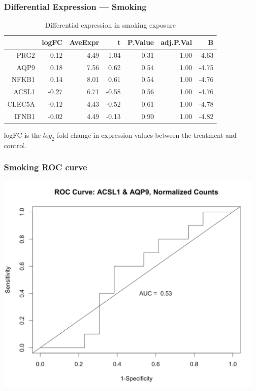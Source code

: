 \documentclass{beamer}
\begin{document}
\begin{frame}[fragile]
  	\frametitle{Differential Expression --- Smoking}
 		\begin{table}[ht]
		\caption {Differential expression in smoking exposure} \label{tab:smoking} 
		\centering
		\begin{tabular}{rrrrrrr}
 		 	\hline
 			& logFC & AveExpr & t & P.Value & adj.P.Val & B \\ 
 			 \hline
			PRG2 & 0.12 & 4.49 & 1.04 & 0.31 & 1.00 & -4.63 \\ 
  			AQP9 & 0.18 & 7.56 & 0.62 & 0.54 & 1.00 & -4.75 \\ 
  			NFKB1 & 0.14 & 8.01 & 0.61 & 0.54 & 1.00 & -4.76 \\ 
  			ACSL1 & -0.27 & 6.71 & -0.58 & 0.56 & 1.00 & -4.76 \\ 
  			CLEC5A & -0.12 & 4.43 & -0.52 & 0.61 & 1.00 & -4.78 \\ 
  			IFNB1 & -0.02 & 4.49 & -0.13 & 0.90 & 1.00 & -4.82 \\ 
  			\hline
		\end{tabular}
		\end{table}
		\small logFC is the $log_{2}$ fold change in expression values between the treatment and control.
\end{frame}

\begin{frame}
	 \frametitle{Smoking ROC curve}
		\centering
	 	\includegraphics[scale=0.4]{../paper/figs/smoking3.png}
\end{frame}
\end{document}
